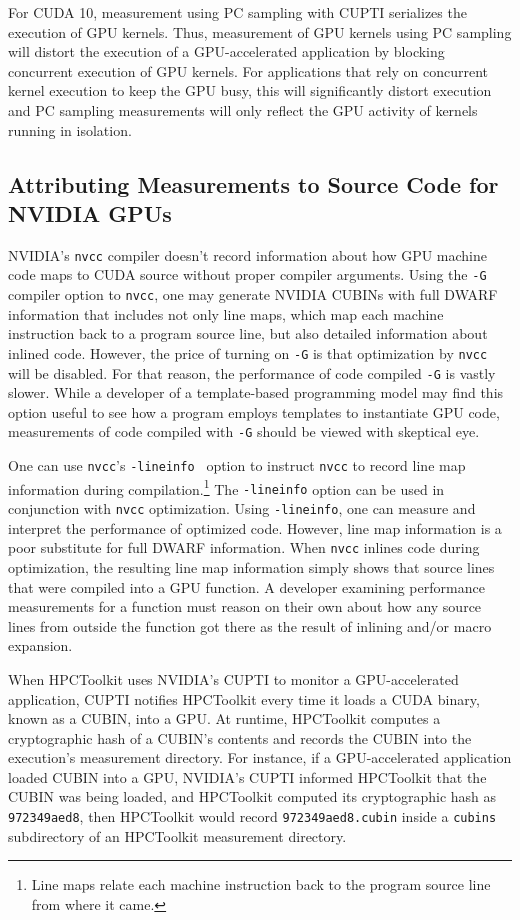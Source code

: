 For CUDA 10, measurement using PC sampling with CUPTI serializes the execution of GPU kernels. Thus, measurement of GPU kernels using PC sampling will distort the execution of a GPU-accelerated application by blocking concurrent execution of GPU kernels. For applications that rely on concurrent kernel execution to keep the GPU busy, this will significantly distort execution and PC sampling measurements will only reflect the GPU activity of kernels running in isolation.




\subsection{Attributing Measurements to Source Code for NVIDIA GPUs}

NVIDIA's {\tt nvcc} compiler doesn't record information about how GPU machine code maps to CUDA source without proper compiler arguments. Using the {\tt -G} compiler option to {\tt nvcc}, one may generate NVIDIA CUBINs with full DWARF information that includes not only line maps, which map each machine instruction back to a program source line, but also detailed information about inlined code. However, the price of turning on {\tt -G} is that optimization by {\tt nvcc} will be disabled. For that reason, the performance of code compiled {\tt -G} is vastly slower. While a developer of a template-based programming model may find this option useful to see how a program employs templates to instantiate GPU code, measurements of code compiled with {\tt -G} should be viewed with skeptical eye.

One can use {\tt nvcc}'s {\tt -lineinfo } option to instruct {\tt nvcc} to record line map information during compilation.\footnote{Line maps relate each machine instruction back to the program source line from where it came.} The {\tt -lineinfo} option can be used in conjunction with {\tt nvcc} optimization. Using {\tt -lineinfo}, one can measure and interpret the performance of optimized code. However, line map information is a poor substitute for full DWARF information. When {\tt nvcc} inlines code during optimization, the resulting line map information simply shows that source lines that were compiled into a GPU function. A developer examining performance measurements for a function must reason on their own about how any source lines from outside the function got there as the result of inlining and/or macro expansion.

When HPCToolkit uses NVIDIA's CUPTI to monitor a GPU-accelerated application, 
CUPTI notifies HPCToolkit every time it loads a CUDA binary, known as a CUBIN, into a GPU.
At runtime, HPCToolkit computes a cryptographic hash of a CUBIN's contents and records the CUBIN into the execution's measurement directory. 
For instance, if a GPU-accelerated application loaded CUBIN into a GPU, NVIDIA's CUPTI informed HPCToolkit that the CUBIN was being loaded, and HPCToolkit computed its cryptographic hash as {\tt 972349aed8}, then HPCToolkit would record {\tt 972349aed8.cubin} inside a {\tt cubins} subdirectory of an HPCToolkit measurement directory. 

